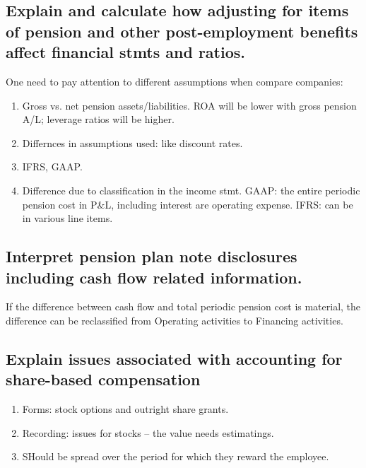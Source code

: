 \documentclass{article}
\newcommand{\be}{\begin{enumerate}}
\newcommand{\ee}{\end{enumerate}}
\begin{document}
\subsection{Explain and calculate how adjusting for items of pension and other
post-employment benefits affect financial stmts and ratios.}
One need to pay attention to different assumptions when compare companies:
\be
    \item Gross vs. net pension assets/liabilities. ROA will be lower with gross
        pension A/L; leverage ratios will be higher.
    \item Differnces in assumptions used: like discount rates.
    \item IFRS, GAAP. 
    \item Difference due to classification in the income stmt. GAAP: the entire 
        periodic pension cost in P\&L, including interest are operating expense.
        IFRS: can be in various line items.
\ee
\subsection{Interpret pension plan note disclosures including cash flow related 
information.}
If the difference between cash flow and total periodic pension cost is material,
the difference can be reclassified from Operating activities to Financing activities.
\subsection{Explain issues associated with accounting for share-based compensation}
\be
    \item Forms: stock options and outright share grants.
    \item Recording: issues for stocks -- the value needs estimatings. 
    \item SHould be spread over the period for which they reward the employee.
\ee
\end{document}
